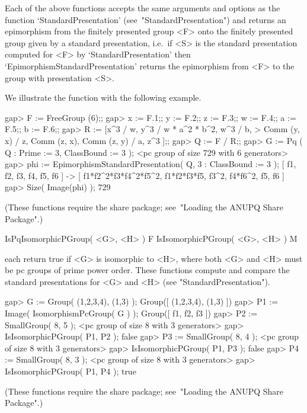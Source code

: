 Each of the above functions accepts the same arguments and options as the
function `StandardPresentation' (see~"StandardPresentation") and  returns
an epimorphism from the finitely presented group <F>  onto  the  finitely
presented group given by a standard  presentation,  i.e.~if  <S>  is  the
standard presentation computed for  <F>  by  `StandardPresentation'  then
`EpimorphismStandardPresentation' returns the epimorphism from <F> to the
group with presentation <S>.

We illustrate the function with the following example.

\beginexample
gap> F := FreeGroup (6);;
gap> x := F.1;; y := F.2;; z := F.3;; w := F.4;; a := F.5;; b := F.6;;
gap> R := [x^3 / w, y^3 / w * a^2 * b^2, w^3 / b,
>          Comm (y, x) / z, Comm (z, x), Comm (z, y) / a, z^3 ];;
gap> Q := F / R;;
gap> G := Pq ( Q : Prime := 3, ClassBound := 3 );
<pc group of size 729 with 6 generators>
gap> phi := EpimorphismStandardPresentation( Q, 3 : ClassBound := 3 );
[ f1, f2, f3, f4, f5, f6 ] -> [ f1*f2^2*f3*f4^2*f5^2, f1*f2*f3*f5, f3^2, 
  f4*f6^2, f5, f6 ]
gap> Size( Image(phi) );
729
\endexample

(These functions require the {\ANUPQ}  share  package;  see~"Loading  the
ANUPQ Share Package".)


\>IsPqIsomorphicPGroup( <G>, <H> ) F
\>IsIsomorphicPGroup( <G>, <H> ) M

each return true if <G> is isomorphic to <H>, where both <G> and <H> must
be pc groups of prime power order. These functions  compute  and  compare
the standard presentations for <G> and <H> (see "StandardPresentation").


\beginexample
gap> G := Group( (1,2,3,4), (1,3) );
Group([ (1,2,3,4), (1,3) ])
gap> P1 := Image( IsomorphismPcGroup( G ) );
Group([ f1, f2, f3 ])
gap> P2 := SmallGroup( 8, 5 );
<pc group of size 8 with 3 generators>
gap> IsIsomorphicPGroup( P1, P2 );
false
gap> P3 := SmallGroup( 8, 4 );
<pc group of size 8 with 3 generators>
gap> IsIsomorphicPGroup( P1, P3 );
false
gap> P4 := SmallGroup( 8, 3 );
<pc group of size 8 with 3 generators>
gap> IsIsomorphicPGroup( P1, P4 );
true
\endexample

(These functions require the {\ANUPQ}  share  package;  see~"Loading  the
ANUPQ Share Package".)


